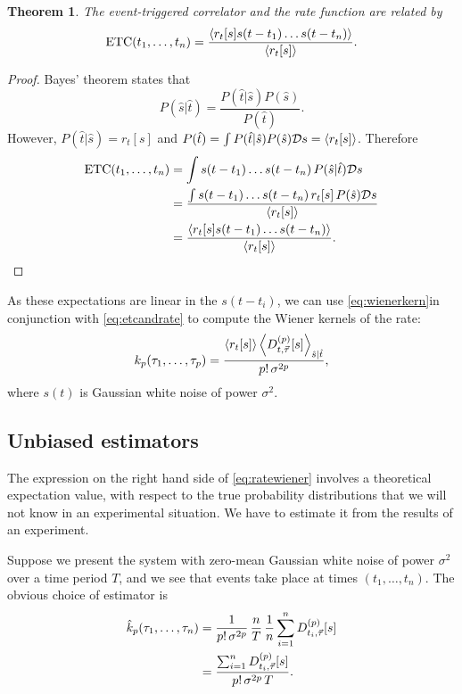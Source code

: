 \documentclass[12pt]{article}
\theoremstyle{slplain}
\newtheorem{thm}{Theorem}
\theoremstyle{sldefinition}
\theoremstyle{remark}
\DeclareMathOperator{\ETC}{ETC}
\begin{document}
\begin{thm}
  The event-triggered correlator and the rate function are related by
  \begin{equation}\label{eq:etcandrate}
    \ETC(t_1,\ldots,t_n) = \frac{\av{r_t[s]s(t-t_1)\ldots s(t-t_n)}}{\av{r_t[s]}}.
  \end{equation}
\end{thm}
\begin{proof}
  Bayes' theorem states that
  \begin{equation}\label{eq:bayes}
    P(\hat{s}|\hat{t}) = \frac{P(\hat{t}|\hat{s})P(\hat{s})}{P(\hat{t})}.
  \end{equation}
  However, $P(\hat{t}|\hat{s})=r_t[s]$ and $P(\hat{t})=\int P(\hat{t}|\hat{s})P(\hat{s})\mathcal{D} s = \left\langle r_t[s] \right\rangle$. Therefore
  \begin{equation}\label{eq:pfetcandrate}
    \begin{aligned}
      \ETC(t_1,\ldots,t_n) &= \int s(t-t_1)\ldots s(t-t_n) \, P(\hat{s}|\hat{t})\CD s\\
        &= \frac{\int s(t-t_1)\ldots s(t-t_n) \, r_t[s]\,P(\hat{s})\CD s }{ \av{r_t[s]} }\\
        &= \frac{\av{r_t[s]s(t-t_1)\ldots s(t-t_n)}}{\av{r_t[s]}}.
    \end{aligned}
  \end{equation}
\end{proof}

As these expectations are linear in the $s(t-t_i)$, we can use \eqref{eq:wienerkern}in conjunction with \eqref{eq:etcandrate} to compute the Wiener kernels of the rate:
%
\begin{equation}\label{eq:ratewiener}
  k_p(\tau_1,\ldots,\tau_p) = \frac{ \left\langle r_t[s] \right\rangle \left\langle D^{(p)}_{t,\vec{\tau}}[s] \right\rangle_{\hat{s}|\hat{t}} }{ p! \, \sigma^{2p} },
\end{equation}
%
where $s(t)$ is Gaussian white noise of power $\sigma^2$.

\subsection{Unbiased estimators}\label{sec:poissonest}

The expression on the right hand side of \eqref{eq:ratewiener} involves a theoretical expectation value, with respect to the true probability distributions that we will not know in an experimental situation. We have to estimate it from the results of an experiment.

Suppose we present the system with zero-mean Gaussian white noise of power $\sigma^2$ over a time period $T$, and we see that events take place at times $(t_1,\ldots,t_n)$. The obvious choice of estimator is
%
\begin{equation}\label{eq:ratewienerest}
  \begin{aligned}
    \hat{k}_p(\tau_1,\ldots,\tau_n) &= \frac{1}{p!\,\sigma^{2p}} \, \frac{n}{T} \, \frac{1}{n} \sum_{i=1}^n D^{(p)}_{t_i,\vec{\tau}}[s] \\
      &= \frac{ \sum_{i=1}^n D^{(p)}_{t_i,\vec{\tau}}[s]}{p!\,\sigma^{2p}\,T}.
  \end{aligned}
\end{equation}
%
\end{document}
